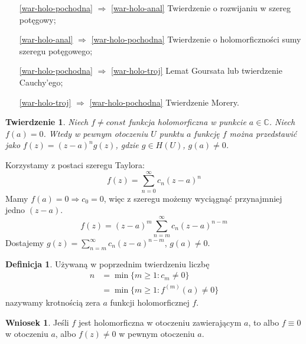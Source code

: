\documentclass[11pt]{article}
\theoremstyle{plain}
\newtheorem*{theorem}{Twierdzenie}
\theoremstyle{definition}
\newtheorem*{definition}{Definicja}
\newtheorem*{corollary}{Wniosek}
\theoremstyle{remark}
\let\oldendproof\endproof
\renewenvironment{proof}[1][\proofname]{
  \oldproof[\textsc{\small #1}]
}{\oldendproof}
\begin{document}
\begin{proof}
  $ $
  \begin{enumerate}[leftmargin=5.1em]
    \item[\ref{war-holo-pochodna} $ \Rightarrow $ \ref{war-holo-anal}]
    Twierdzenie o rozwijaniu w szereg potęgowy;

    \item[\ref{war-holo-anal} $ \Rightarrow $ \ref{war-holo-pochodna}]
    Twierdzenie o holomorficzności sumy szeregu potęgowego;

    \item[\ref{war-holo-pochodna} $ \Rightarrow $ \ref{war-holo-troj}]
    Lemat Goursata lub twierdzenie Cauchy’ego;

    \item[\ref{war-holo-troj} $ \Rightarrow $ \ref{war-holo-pochodna}]
    Twierdzenie Morery.
  \end{enumerate}
\end{proof}

\begin{theorem}
  Niech $ f \neq const $ funkcja holomorficzna w punkcie $ a \in \mathbb{C} $.
  Niech $ f(a) = 0 $.
  Wtedy w pewnym otoczeniu $ U $ punktu $ a $ funkcję $ f $ można przedstawić jako $ f(z) = (z-a)^{n}g(z) $,
  gdzie $ g \in H(U) $, $ g(a) \neq 0 $.
\end{theorem}

\begin{proof}
  Korzystamy z postaci szeregu Taylora:
  $$ f(z) = \sum_{n=0}^{\infty} c_n(z-a)^n $$
  Mamy $ f(a) = 0 \Rightarrow c_0 = 0 $, więc z szeregu możemy wyciągnąć przynajmniej jedno $ (z-a) $.
  $$ f(z) = (z-a)^m \sum_{n=m}^{\infty} c_n(z-a)^{n-m} $$
  Dostajemy $ g(z) = \sum_{n=m}^{\infty} c_n(z-a)^{n-m} $, $ g(a) \neq 0 $.
\end{proof}

\begin{definition}
  Używaną w poprzednim twierdzeniu liczbę
  \begin{align*}
    n &
    = \min \{m \geq 1: c_m \neq 0\} \\ &
    = \min \{m \geq 1: f^{(m)}(a) \neq 0\}
  \end{align*}
  nazywamy krotnością zera $ a $ funkcji holomorficznej $ f $.
\end{definition}

\begin{corollary}
  Jeśli $ f $ jest holomorficzna w otoczeniu zawierającym $ a $, to
  albo $ f \equiv 0 $ w otoczeniu $ a $,
  albo $ f(z) \neq 0 $ w pewnym otoczeniu $ a $.
\end{corollary}
\end{document}
